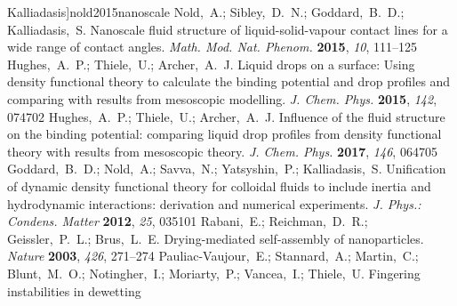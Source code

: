\documentclass[journal=langd5,manuscript=article]{achemso}
\begin{document}
\begin{mcitethebibliography}{71}
  Kalliadasis]{nold2015nanoscale}
Nold,~A.; Sibley,~D.~N.; Goddard,~B.~D.; Kalliadasis,~S. Nanoscale fluid
  structure of liquid-solid-vapour contact lines for a wide range of contact
  angles. \emph{Math. Mod. Nat. Phenom.} \textbf{2015}, \emph{10},
  111--125\relax
\mciteBstWouldAddEndPuncttrue
\mciteSetBstMidEndSepPunct{\mcitedefaultmidpunct}
{\mcitedefaultendpunct}{\mcitedefaultseppunct}\relax
\EndOfBibitem
{}
Hughes,~A.~P.; Thiele,~U.; Archer,~A.~J. Liquid drops on a surface: Using
  density functional theory to calculate the binding potential and drop
  profiles and comparing with results from mesoscopic modelling. \emph{J. Chem.
  Phys.} \textbf{2015}, \emph{142}, 074702\relax
\mciteBstWouldAddEndPuncttrue
\mciteSetBstMidEndSepPunct{\mcitedefaultmidpunct}
{\mcitedefaultendpunct}{\mcitedefaultseppunct}\relax
\EndOfBibitem
{}
Hughes,~A.~P.; Thiele,~U.; Archer,~A.~J. Influence of the fluid structure on
  the binding potential: comparing liquid drop profiles from density functional
  theory with results from mesoscopic theory. \emph{J. Chem. Phys.}
  \textbf{2017}, \emph{146}, 064705\relax
\mciteBstWouldAddEndPuncttrue
\mciteSetBstMidEndSepPunct{\mcitedefaultmidpunct}
{\mcitedefaultendpunct}{\mcitedefaultseppunct}\relax
\EndOfBibitem
{}
Goddard,~B.~D.; Nold,~A.; Savva,~N.; Yatsyshin,~P.; Kalliadasis,~S. Unification
  of dynamic density functional theory for colloidal fluids to include inertia
  and hydrodynamic interactions: derivation and numerical experiments. \emph{J.
  Phys.: Condens. Matter} \textbf{2012}, \emph{25}, 035101\relax
\mciteBstWouldAddEndPuncttrue
\mciteSetBstMidEndSepPunct{\mcitedefaultmidpunct}
{\mcitedefaultendpunct}{\mcitedefaultseppunct}\relax
\EndOfBibitem
{}
Rabani,~E.; Reichman,~D.~R.; Geissler,~P.~L.; Brus,~L.~E. Drying-mediated
  self-assembly of nanoparticles. \emph{Nature} \textbf{2003}, \emph{426},
  271--274\relax
\mciteBstWouldAddEndPuncttrue
\mciteSetBstMidEndSepPunct{\mcitedefaultmidpunct}
{\mcitedefaultendpunct}{\mcitedefaultseppunct}\relax
\EndOfBibitem
{}
Pauliac-Vaujour,~E.; Stannard,~A.; Martin,~C.; Blunt,~M.~O.; Notingher,~I.;
  Moriarty,~P.; Vancea,~I.; Thiele,~U. Fingering instabilities in dewetting

\end{mcitethebibliography}
\end{document}
